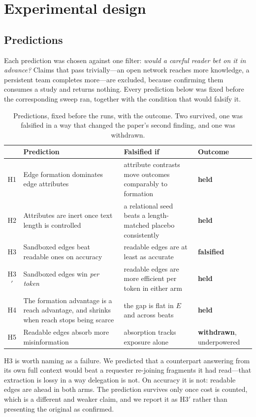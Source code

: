 \section{Experimental design}
\label{sec:design}

\subsection{Predictions}

Each prediction was chosen against one filter: \emph{would a careful reader bet on it
in advance?} Claims that pass trivially---an open network reaches more knowledge, a
persistent team completes more---are excluded, because confirming them consumes a
study and returns nothing. Every prediction below was fixed before the corresponding
sweep ran, together with the condition that would falsify it.

\begin{table}[t]
\centering\small
\caption{Predictions, fixed before the runs, with the outcome. Two survived, one was
falsified in a way that changed the paper's second finding, and one was withdrawn.}
\label{tab:hyp}
\begin{tabular}{@{}clp{5.4cm}l@{}}
\toprule
& \textbf{Prediction} & \textbf{Falsified if} & \textbf{Outcome} \\
\midrule
H1 & Edge formation dominates edge attributes & attribute contrasts move outcomes comparably to formation & \textbf{held} \\
H2 & Attributes are inert once text length is controlled & a relational seed beats a length-matched placebo consistently & \textbf{held} \\
H3 & Sandboxed edges beat readable ones on accuracy & readable edges are at least as accurate & \textbf{falsified} \\
H3$'$ & Sandboxed edges win \emph{per token} & readable edges are more efficient per token in either arm & \textbf{held} \\
H4 & The formation advantage is a reach advantage, and shrinks when reach stops being scarce & the gap is flat in $E$ and across beats & \textbf{held} \\
H5 & Readable edges absorb more misinformation & absorption tracks exposure alone & \textbf{withdrawn}, underpowered \\
\bottomrule
\end{tabular}
\end{table}

H3 is worth naming as a failure. We predicted that a counterpart answering from its own
full context would beat a requester re-joining fragments it had read---that extraction
is lossy in a way delegation is not. On accuracy it is not: readable edges are ahead in
both arms. The prediction survives only once cost is counted, which is a different and
weaker claim, and we report it as H3$'$ rather than presenting the original as
confirmed.

